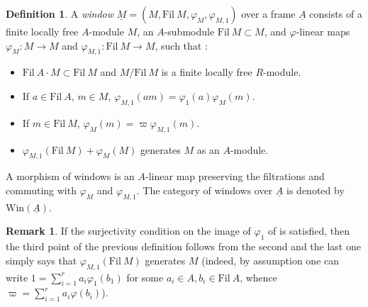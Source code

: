 \documentclass{amsart}
\theoremstyle{plain}
\theoremstyle{definition}
\newtheorem{definition}[theorem]{Definition}
\newtheorem{remark}[theorem]{Remark}
\newcommand{\Fil}{\mathrm{Fil}}
\newcommand{\Win}{\mathrm{Win}}
\newcommand{\red}[1]{{\color{black} #1}}
\begin{document}
\begin{definition} \label{window}
	A \textit{window} $\underline{M}=(M,\mathrm{Fil}~M,\varphi_M,\varphi_{M,1})$ over a frame $\underline{A}$ consists of a finite locally free $A$-module $M$, an $A$-submodule $\Fil~M \subset M$, and $\varphi$-linear maps $\varphi_M : M \to M$ and $\varphi_{M,1} : \mathrm{Fil}~M \to M$, such that :
	\begin{itemize}
		\item $\Fil~A \cdot M \subset \mathrm{Fil}~M$ and $M/\mathrm{Fil}~M$ is a finite locally free $R$-module.
		\item If $a \in \mathrm{Fil}~A$, $m \in M$, $\varphi_{M,1}(am)= \varphi_1(a)\varphi_M(m)$.
		\item If $m \in \mathrm{Fil}~M$, $\varphi_M(m)=\varpi \varphi_{M,1}(m)$.
		\item $\varphi_{M,1}(\mathrm{Fil}~M) + \varphi_M(M)$ generates $M$ as an $A$-module. 
	\end{itemize} 
A morphism of windows is an $A$-linear map preserving the filtrations and commuting with $\varphi_M$ and $\varphi_{M,1}$. The category of windows over $\underline{A}$ is denoted by $\Win(\underline{A})$.  
\end{definition}

\begin{remark} \label{simplifications}
	If the surjectivity condition on the image of $\varphi_1$ of  is satisfied, then the third point of the previous definition follows from the second and the last one simply says that $\varphi_{M,1}(\mathrm{Fil}~M)$ generates $M$ \red{(indeed, by assumption one can write $1=\sum_{i=1}^r a_i \varphi_1(b_1)$ for some $a_i \in A, b_i \in \mathrm{Fil}~A$, whence $\varpi=\sum_{i=1}^r a_i \varphi(b_i)$)}.
	\end{remark}
	
\end{document}
